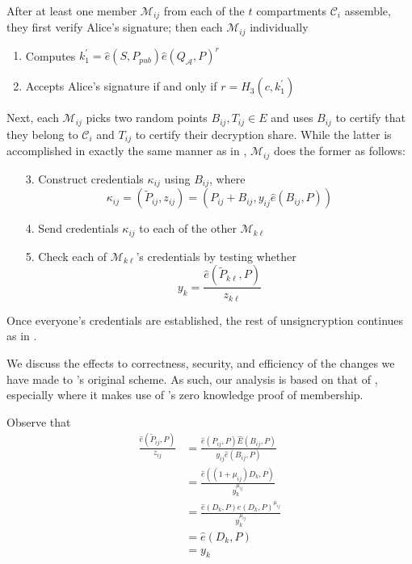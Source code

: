 
After at least one member $\mathcal{M}_{ij}$ from each of the $t$ compartments
    $\mathcal{C}_i$ assemble, they first verify Alice's signature; then each
    $\mathcal{M}_{ij}$ individually

\begin{enumerate}
\item Computes $k_1^\prime = \widehat{e}(S, P_{pub})\widehat{e}(Q_\mathcal{A},
    P)^r$
\item Accepts Alice's signature if and only if $r = H_3(c, k_1^\prime)$
\end{enumerate}

Next, each $\mathcal{M}_{ij}$ picks two random points $B_{ij}, T_{ij} \in
    E$ and uses $B_{ij}$ to certify that they belong to $\mathcal{C}_i$ and
    $T_{ij}$ to certify their decryption share.
While the latter is accomplished in exactly the same manner as in
    \cite{li2006id}, $\mathcal{M}_{ij}$ does the former as follows:
\begin{enumerate}
\item[3.] Construct credentials $\kappa_{ij}$ using $B_{ij}$, where
\[
\kappa_{ij}
    = (\widetilde{P}_{ij}, z_{ij})
    = \left(P_{ij} + B_{ij}, y_{ij}\widehat{e}(B_{ij}, P)\right)
\]
\item[4.] Send credentials $\kappa_{ij}$ to each of the other
    $\mathcal{M}_{k\ell}$
\item[5.] Check each of $\mathcal{M}_{k\ell}$'s credentials by testing whether
\[
y_k = \frac{\widehat{e}(\widetilde{P}_{k\ell}, P)}{z_{k\ell}}
\]
\end{enumerate}

Once everyone's credentials are established, the rest of unsigncryption
    continues as in \cite{li2006id}.



We discuss the effects to correctness, security, and efficiency of the changes
    we have made to \cite{li2006id}'s original scheme.
As such, our analysis is based on that of \cite{li2006id}, especially where it
    makes use of \cite{baek2004identity}'s zero knowledge proof of membership.



Observe that
\begin{align*}
\frac{\widehat{e}(\widetilde{P}_{ij}, P)}{z_{ij}}
    &=  \frac{\widehat{e}(P_{ij}, P)\widehat{E}(B_{ij}, P)}
            {y_{ij}\widehat{e}(B_{ij}, P)}\\
    &=  \frac{\widehat{e}\left((1 + \mu_{ij})D_k, P\right)}
            {y_k^{\mu_{ij}}}\\
    &=  \frac{\widehat{e}(D_k, P)\widehat{e}(D_k, P)^{\mu_{ij}}}
            {y_k^{\mu_{ij}}}\\
    &=  \widehat{e}(D_k, P)\\
    &=  y_k
\end{align*}

